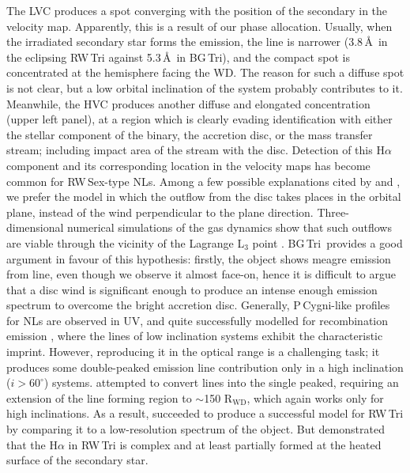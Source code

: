 \documentclass[fleqn,usenatbib]{mnras}
\def\bg{BG\,Tri}
\begin{document}
The LVC produces a spot converging with the position of the secondary in the velocity map. Apparently, this is a result of our phase
allocation. Usually, when the irradiated secondary star forms the emission, the line is narrower  (3.8\,\AA\ in the eclipsing RW\,Tri
\citep{Subebekova20} against 5.3\,\AA\ in \bg), and the compact spot is concentrated at the hemisphere facing the WD. The reason for such a
diffuse spot is not clear, but a low orbital inclination of the system probably contributes to it.  
Meanwhile, the HVC produces another diffuse  and elongated concentration (upper left panel), at a region which is clearly evading
identification with either the stellar component of the binary, the accretion disc, or the mass transfer stream; including impact area of the
stream with the disc. Detection of this H$\alpha$ component and its corresponding location in the velocity maps has become common for
RW\,Sex-type NLs. Among a few possible explanations cited by \citet{2017MNRAS.470.1960H} and \citet{Subebekova20}, we prefer the 
model in which the outflow from the disc takes places in the orbital plane, instead of the wind perpendicular to the plane direction. Three-dimensional numerical simulations of the gas dynamics show that such outflows are viable through the vicinity of the Lagrange L$_3$ point \citep{2007ARep...51..836S}. \bg\ provides a good argument in favour of this hypothesis: firstly, the object shows meagre emission from  line, even though we observe it almost face-on, hence it is difficult to argue that a disc wind 
is significant enough to produce an intense enough emission spectrum \citep[e.g.][]{10.1093/mnras/stv867}  to overcome the bright accretion
disc. Generally, P\,Cygni-like profiles for NLs are observed in UV, and quite successfully modelled for recombination emission
\citep{2002ApJ...579..725L}, where the lines of low inclination systems  exhibit the characteristic imprint. However, reproducing it in the
optical range is a challenging task; it produces some double-peaked emission line contribution only in a high inclination ($i>60^\circ$) systems.
\citet{2016PhDT.......348M} attempted to convert lines into the single peaked, requiring an extension of the line forming region to $\sim$150
R$_{\mathrm {WD}}$, which again works only for high inclinations. As a result, \citet{2016PhDT.......348M} succeeded to produce a successful
model for RW\,Tri by comparing it to a low-resolution spectrum of the object. But \citet{Subebekova20} demonstrated that the H$\alpha$ in RW\,Tri
is complex and at least partially formed at the heated surface of the secondary star.   
\end{document}
